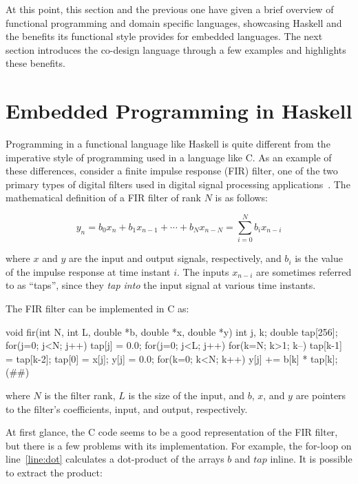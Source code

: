 \documentclass[../paper.tex]{subfiles}
\begin{document}
At this point, this section and the previous one have given a brief overview of functional programming and domain specific languages, showcasing Haskell and the benefits its functional style provides for embedded languages. The next section introduces the co-design language through a few examples and highlights these benefits.

\section{Embedded Programming in Haskell}
\label{embedded}

Programming in a functional language like Haskell is quite different from the imperative style of programming used in a language like C. As an example of these differences, consider a finite impulse response (FIR) filter, one of the two primary types of digital filters used in digital signal processing applications~\cite{oppenheim1989}. The mathematical definition of a FIR filter of rank $N$ is as follows:

\begin{equation}
y_{n} = b_{0} x_{n} + b_{1} x_{n-1} + \cdots + b_{N} x_{n-N} = \sum_{i=0}^{N} b_{i} x_{n-i}
\end{equation}
\vspace{1mm}

\noindent where $x$ and $y$ are the input and output signals, respectively, and $b_i$ is the value of the impulse response at time instant $i$. The inputs $x_{n-i}$ are sometimes referred to as ``taps'', since they \textit{tap into} the input signal at various time instants. 

The FIR filter can be implemented in C as:

\begin{code}
void fir(int N, int L, double *b, double *x, double *y) {
 int j, k;
 double tap[256];
 for(j=0; j<N; j++) tap[j] = 0.0;
 for(j=0; j<L; j++) {
  for(k=N; k>1; k--) tap[k-1] = tap[k-2];
  tap[0] = x[j];
  y[j] = 0.0;
  for(k=0; k<N; k++) y[j] += b[k] * tap[k]; (#\label{line:dot}#)
 }
}
\end{code}

\noindent where $N$ is the filter rank, $L$ is the size of the input, and $b$, $x$, and $y$ are pointers to the filter's coefficients, input, and output, respectively.

At first glance, the C code seems to be a good representation of the FIR filter, but there is a few problems with its implementation. For example, the for-loop on line~\ref{line:dot} calculates a dot-product of the arrays $b$ and $tap$ inline. It is possible to extract the product:
\end{document}
